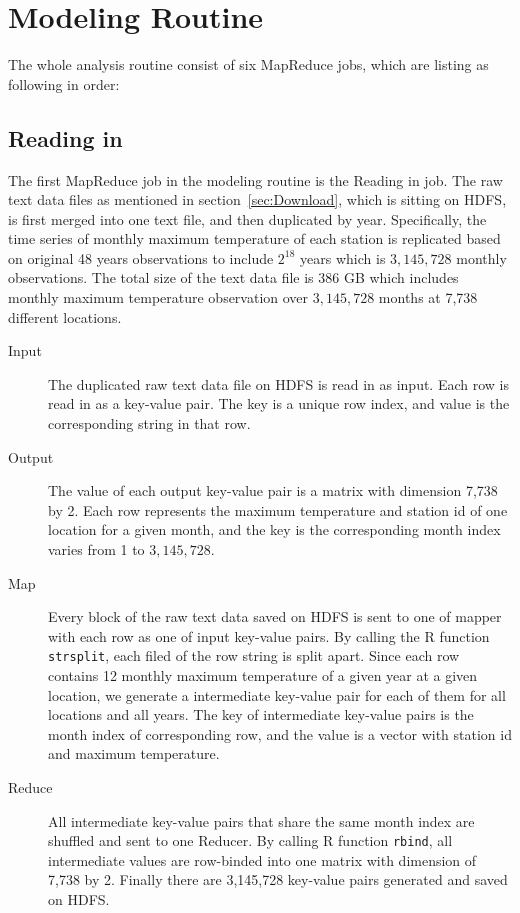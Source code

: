 \section{Modeling Routine}

The whole analysis routine consist of six MapReduce jobs, which are listing as
following in order:

\subsection{Reading in}

The first MapReduce job in the modeling routine is the Reading in job.
The raw text data files as mentioned in section~\ref{sec:Download}, which is 
sitting on HDFS, is first merged into one text file, and then duplicated by
year. Specifically, the time series of monthly maximum temperature of each station
is replicated based on original 48 years observations to include $2^{18}$ years 
which is $3,145,728$ monthly observations. 
The total size of the text data file is 386 GB which includes monthly maximum
temperature observation over $3,145,728$ months at 7,738 different locations.

\begin{description}
  \item[Input] The duplicated raw text data file on HDFS is read in as input. Each
  row is read in as a key-value pair. The key is a unique row index, and value
  is the corresponding string in that row. 
  \item[Output] The value of each output key-value pair is a matrix with dimension
  7,738 by 2. Each row represents the maximum temperature and station id of one 
  location for a given month, and the key is the corresponding month index varies 
  from 1 to $3,145,728$. 
  \item[Map] Every block of the raw text data saved on HDFS is sent to one of 
  mapper with each row as one of input key-value pairs. By calling the R function
  \texttt{strsplit}, each filed of the row string is split apart. Since each
  row contains 12 monthly maximum temperature of a given year at a given location,
  we generate a intermediate key-value pair for each of them for all locations
  and all years. The key of 
  intermediate key-value pairs is the month index of corresponding row, and the 
  value is a vector with station id and maximum temperature.
  \item[Reduce] All intermediate key-value pairs that share the same month index
  are shuffled and sent to one Reducer. By calling R function \texttt{rbind}, 
  all intermediate values are row-binded into one matrix with dimension of 7,738
  by 2. Finally there are 3,145,728 key-value pairs generated and saved on HDFS.
\end{description}

